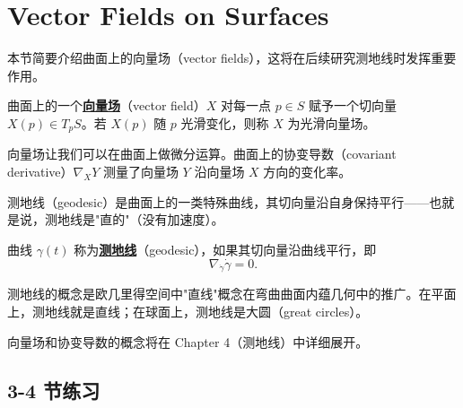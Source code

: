 \section{Vector Fields on Surfaces}\label{sec:vector-fields}

本节简要介绍曲面上的向量场（vector fields），这将在后续研究测地线时发挥重要作用。

\begin{Definition}[向量场]\label{def:vector-field}
曲面上的一个\textbf{\underline{向量场}}（vector field）$X$ 对每一点 $p \in S$ 赋予一个切向量 $X(p) \in T_pS$。若 $X(p)$ 随 $p$ 光滑变化，则称 $X$ 为光滑向量场。
\end{Definition}

向量场让我们可以在曲面上做微分运算。曲面上的协变导数（covariant derivative）$\nabla_X Y$ 测量了向量场 $Y$ 沿向量场 $X$ 方向的变化率。

测地线（geodesic）是曲面上的一类特殊曲线，其切向量沿自身保持平行——也就是说，测地线是"直的"（没有加速度）。

\begin{Definition}[测地线]\label{def:geodesic}
曲线 $\gamma(t)$ 称为\textbf{\underline{测地线}}（geodesic），如果其切向量沿曲线平行，即
\[
\nabla_{\dot{\gamma}} \dot{\gamma} = 0.
\tag{3-4-1}
\]
\end{Definition}

测地线的概念是欧几里得空间中"直线"概念在弯曲曲面内蕴几何中的推广。在平面上，测地线就是直线；在球面上，测地线是大圆（great circles）。

向量场和协变导数的概念将在 Chapter 4（测地线）中详细展开。

\subsection*{3-4 节练习}

